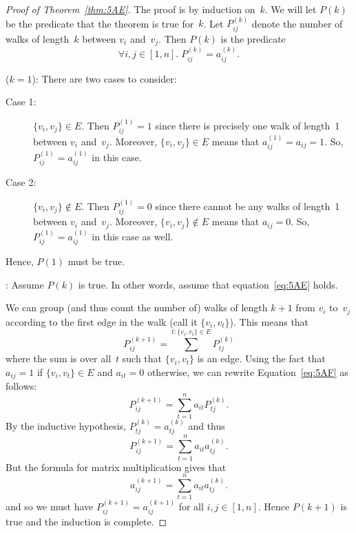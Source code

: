 \begin{proof}[Proof of Theorem~\ref{thm:5AE}]
The proof is by induction on~$k$.  We will let $P(k)$ be the predicate
that the theorem is true for~$k$.  Let $P_{ij}^{(k)}$ denote the
number of walks of length~$k$ between $v_i$ and~$v_j$.  Then $P(k)$ is
the predicate
\begin{equation}\label{eq:5AE}
    \forall i, j \in [1, n].\; P_{ij}^{(k)} = a_{ij}^{(k)}.
\end{equation}

 ($k = 1$):  There are two cases to consider:
\begin{description}

\item[Case 1:]

$\{ v_i, v_j \} \in E$.  Then $P_{ij}^{(1)} = 1$ since there is
  precisely one walk of length~1 between $v_i$ and~$v_j$.  Moreover,
  $\{ v_i, v_j \} \in E$ means that $a_{ij}^{(1)} = a_{ij} = 1$.  So,
  $P_{ij}^{(1)} = a_{ij}^{(1)}$ in this case.

\item[Case 2:]

$\{ v_i, v_j \} \notin E$.  Then $P_{ij}^{(1)} = 0$ since there
  cannot be any walks of length~1 between $v_i$ and~$v_j$.  Moreover,
  $\{ v_i, v_j \} \notin E$ means that $a_{ij} = 0$.  So,
  $P_{ij}^{(1)} = a_{ij}^{(1)}$ in this case as well.

\end{description}

Hence, $P(1)$ must be true.

:
Assume $P(k)$ is true.  In other words, assume that
equation~\ref{eq:5AE} holds.

We can group (and thus count the number of) walks of length $k+1$
from $v_i$ to~$v_j$ according to the first edge in the walk (call it
$\{ v_i, v_t \}$).  This means that
\begin{equation}\label{eq:5AF}
    P_{ij}^{(k + 1)} = \sum^{t: \{ v_i, v_t \} \in E} P_{tj}^{(k)}
\end{equation}
where the sum is over all~$t$ such that $\{ v_i, v_t \}$ is an edge.
Using the fact that $a_{ij} = 1$ if $\{ v_i, v_t \} \in E$ and $a_{it}
= 0$ otherwise, we can rewrite Equation~\ref{eq:5AF} as follows:
\begin{equation*}
    P_{ij}^{(k + 1)} = \sum_{t = 1}^{n} a_{it} P_{tj}^{(k)}.
\end{equation*}
By the inductive hypothesis, $P_{tj}^{(k)} = a_{tj}^{(k)}$ and thus
\begin{equation*}
    P_{ij}^{(k + 1)} = \sum_{t = 1}^{n} a_{it} a_{tj}^{(k)}.
\end{equation*}
But the formula for matrix multiplication gives that
\begin{equation*}
    a_{ij}^{(k + 1)} = \sum_{t = 1}^{n} a_{it} a_{tj}^{(k)}.
\end{equation*}
and so we must have $P_{ij}^{(k+1)} = a_{ij}^{(k+1)}$ for all $i, j
\in [1, n]$.  Hence $P(k+1)$ is true and the induction is complete.
\end{proof}


